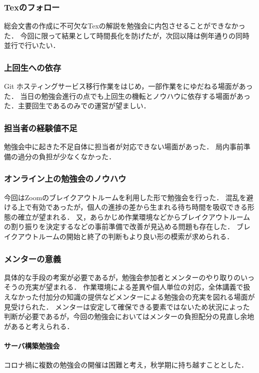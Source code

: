 \subsubsection*{Texのフォロー}
総会文書の作成に不可欠なTexの解説を勉強会に内包させることができなかった．
今回に限って結果として時間長化を防げたが，次回以降は例年通りの同時並行で行いたい．
\subsubsection*{上回生への依存}
Git ホスティングサービス移行作業をはじめ，一部作業を\fourthGrade{}にゆだねる場面があった．
当日の勉強会進行の点でも上回生の機転とノウハウに依存する場面があった．主要回生である\secondGrade{}のみでの運営が望ましい．
\subsubsection*{担当者の経験値不足}
勉強会中に起きた不足自体に担当者が対応できない場面があった．
局内事前準備の過分の負担が少なくなかった．
\subsubsection*{オンライン上の勉強会のノウハウ}
今回はZoomのブレイクアウトルームを利用した形で勉強会を行った．
混乱を避ける上で有効であったが，個人の進捗の差から生まれる待ち時間を吸収できる形態の確立が望まれる．
又，あらかじめ作業環境などからブレイクアウトルームの割り振りを決定するなどの事前準備で改善が見込める問題も存在した．
ブレイクアウトルームの開始と終了の判断もより良い形の模索が求められる．
\subsubsection*{メンターの意義}
具体的な手段の考案が必要であるが，勉強会参加者とメンターのやり取りのいっそうの充実が望まれる．
作業環境による差異や個人単位の対応，全体講義で扱えなかった付加分の知識の提供などメンターによる勉強会の充実を図れる場面が見受けられた．
メンターは安定して確保できる要素ではないため状況によった判断が必要であるが，今回の勉強会においてはメンターの負担配分の見直し余地があると考えられる．



\paragraph{サーバ構築勉強会}
コロナ禍に複数の勉強会の開催は困難と考え，秋学期に持ち越すこととした．

